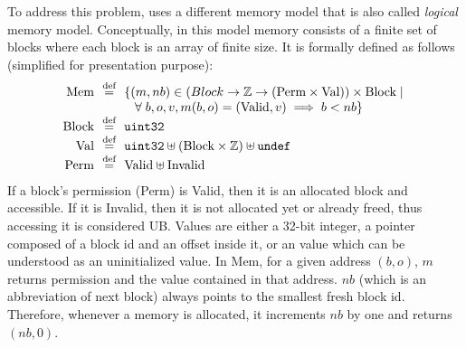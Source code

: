 To address this problem, \cc{} uses a different memory model that is also called {\it logical} memory model.
Conceptually, in this model memory consists of a finite set of blocks where each block is an array of finite size.
It is formally defined as follows (simplified for presentation purpose):
\[
\begin{array}{r@{~~}c@{~~}l}
\textrm{Mem} & \defeq & \{ (m, nb) \in (Block \rightarrow \mathbb{Z} \rightarrow (\textrm{Perm} \times \textrm{Val})) \times \textrm{Block} \; | \; \\
& & \;\;\; \forall \; b, o, v, m(b, o) = (\textrm{Valid}, v) \implies b < nb \} \\
\textrm{Block} & \defeq & \texttt{uint32} \\
\textrm{Val} & \defeq & \texttt{uint32} \uplus (\textrm{Block} \times \mathbb{Z}) \uplus \Undef \\
\textrm{Perm} & \defeq & \textrm{Valid} \uplus \textrm{Invalid} \\
\end{array}
\]
If a block's permission (\textrm{Perm}) is \textrm{Valid}, then it is an allocated block and accessible. If it is \textrm{Invalid}, then it is not allocated yet or already freed, thus accessing it is considered UB.
Values are either a 32-bit integer, a pointer composed of a block id and an offset inside it, or an \Undef value which can be understood as an uninitialized value. %
In $\textrm{Mem}$, for a given address $(b,o)$, $m$ returns permission and the value contained in that address.
$nb$ (which is an abbreviation of next block) always points to the smallest fresh block id. Therefore, whenever a memory is allocated, it increments $nb$ by one and returns $(nb, 0)$.

